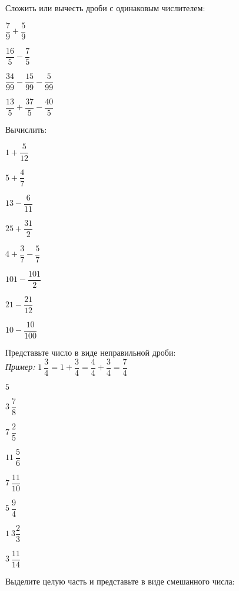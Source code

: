 %
%
%
%
\begin{class}[number=1]
	\begin{listofex}
		\item Сложить или вычесть дроби с одинаковым числителем:
		\begin{enumcols}[itemcolumns=4]
			\item \( \dfrac{7}{9}+\dfrac{5}{9} \)
			\item \( \dfrac{16}{5}-\dfrac{7}{5} \)
			\item \( \dfrac{34}{99}-\dfrac{15}{99}-\dfrac{5}{99} \)
			\item \( \dfrac{13}{5}+\dfrac{37}{5}-\dfrac{40}{5} \)
		\end{enumcols}
		\item Вычислить:
		\begin{enumcols}[itemcolumns=4]
			\item \( 1+\dfrac{5}{12} \)
			\item \( 5+\dfrac{4}{7} \)
			\item \( 13-\dfrac{6}{11} \)
			\item \( 25+\dfrac{31}{2} \)
			\item \( 4+\dfrac{3}{7}-\dfrac{5}{7} \)
			\item \( 101-\dfrac{101}{2} \)
			\item \( 21-\dfrac{21}{12} \)
			\item \( 10-\dfrac{10}{100} \)
		\end{enumcols}
		\item Представьте число в виде неправильной дроби:\\
		\textit{Пример:} \( 1\:\dfrac{3}{4}=1+\dfrac{3}{4}=\dfrac{4}{4}+\dfrac{3}{4}=\dfrac{7}{4} \)
		\begin{enumcols}[itemcolumns=4]
			\item \( 5 \)
			\item \( 3\:\dfrac{7}{8} \)
			\item \( 7\:\dfrac{2}{5} \)
			\item \( 11\:\dfrac{5}{6} \)
			\item \( 7\:\dfrac{11}{10} \)
			\item \( 5\:\dfrac{9}{4} \)
			\item \( 1\:3\dfrac{2}{3} \)
			\item \( 3\:\dfrac{11}{14} \)
		\end{enumcols}
		\item Выделите целую часть и представьте в виде смешанного числа:\\

\end{listofex}
\end{class}
